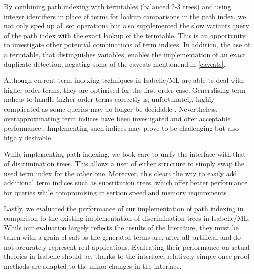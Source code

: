 By combining path indexing with termtables (balanced 2-3 trees) and using integer identifiers in place of terms for lookup comparisons in the path index, we not only sped up all set operations but also supplemented the slow variants query of the path index with the exact lookup of the termtable. This is an opportunity to investigate other potential combinations of term indices. In addition, the use of a termtable, that distinguishes variables, enables the implementation of an exact duplicate detection, negating some of the caveats mentionend in \cref{caveats}.

Although current term indexing techniques in Isabelle/ML are able to deal with higher-order terms, they are optimised for the first-order case.
Generalising term indices to handle higher-order terms correctly is, unfortunately, highly complicated as some queries may no longer be decidable \cite{goldfarb_undecidability_1981}. Nevertheless, overapproximating term indices have been investigated and offer acceptable performance \cite{pientka_higher-order_2009,libal_towards_2016}. Implementing such indices may prove to be challenging but also highly desirable.

While implementing path indexing, we took care to unify the interface with that of discrimination trees. This allows a user of either structure to simply swap the used term index for the other one. Moreover, this clears the way to easily add additional term indices such as substitution trees, which offer better performance for queries while compromising in sertion speed and memory requirements \cite{carbonell_comparison_1995}.

Lastly, we evaluated the performance of our implementation of path indexing in comparison to the existing implementation of discrimination trees in Isabelle/ML. While our evaluation largely reflects the results of the literature, they must be taken with a grain of salt as the generated terms are, after all, artificial and do not accurately represent real applications. Evaluating their performance on actual theories in Isabelle should be, thanks to the interface, relatively simple once proof methods are adapted to the minor changes in the interface.
